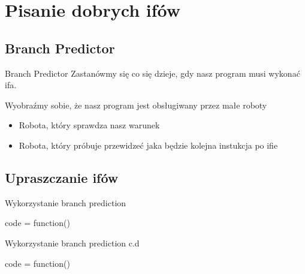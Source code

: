 \documentclass[polish]{beamer}
\begin{document}
\section{Pisanie dobrych ifów}
\subsection{Branch Predictor}
\begin{frame}{Branch Predictor}
  Zastanówmy się co się dzieje, gdy nasz program musi wykonać ifa.

  \begin{block}{Wyobraźmy sobie, że nasz program jest obsługiwany przez małe roboty}
    \begin{itemize}
      \item Robota, który sprawdza nasz warunek
      \item Robota, który próbuje przewidzeć jaka będzie kolejna instukcja po ifie
    \end{itemize}
  \end{block}

\end{frame}


\subsection{Upraszczanie ifów}
\begin{frame}{Wykorzystanie branch prediction}

  \small
    \begin{algorithm}[H]
        \SetAlgoLined
        code = function()
        \caption{Obsługa błędów}
    \end{algorithm}


\end{frame}


\begin{frame}{Wykorzystanie branch prediction c.d}

  \small
    \begin{algorithm}[H]
        \SetAlgoLined
        code = function()
        \caption{Obsługa błędów lepsza}
    \end{algorithm}


\end{frame}
\end{document}
